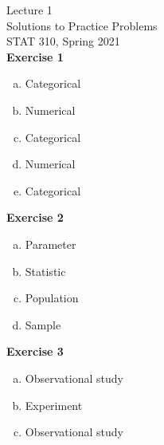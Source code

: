 \documentclass[11pt, fleqn]{article}
\begin{document}
\setlength\parindent{0pt}
Lecture 1\\
Solutions to Practice Problems\\
STAT 310, Spring 2021\\

\textbf{Exercise 1}
\begin{enumerate}[(a)]
\item Categorical
\item Numerical
\item Categorical
\item Numerical
\item Categorical\\
\end{enumerate}

\textbf{Exercise 2}
\begin{enumerate}[(a)]
\item Parameter
\item Statistic
\item Population
\item Sample\\
\end{enumerate}

\textbf{Exercise 3}
\begin{enumerate}[(a)]
\item Observational study
\item Experiment
\item Observational study
\end{enumerate}
\end{document}
